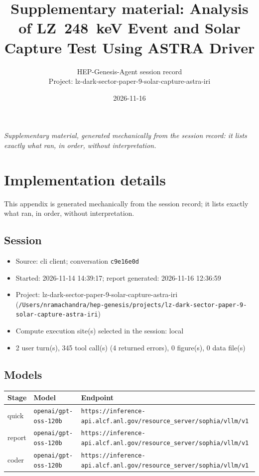\documentclass[11pt,a4paper]{article}
\title{Supplementary material: Analysis of LZ~248~keV Event and Solar Capture Test Using ASTRA Driver}
\author{HEP-Genesis-Agent session record \\ \small Project: lz-dark-sector-paper-9-solar-capture-astra-iri}
\date{2026-11-16}
\begin{document}
\maketitle
\noindent\textit{\small Supplementary material, generated mechanically from the session record: it lists exactly what ran, in order, without interpretation.}
\vspace{1em}



\appendix
\section{Implementation details}
\label{app:impl}
This appendix is generated mechanically from the session record; it lists exactly what ran, in order, without interpretation.
\subsection{Session}
\begin{itemize}
  \item Source: cli client; conversation \texttt{c9e16e0d}
  \item Started: 2026-11-14 14:39:17; report generated: 2026-11-16 12:36:59
  \item Project: lz-dark-sector-paper-9-solar-capture-astra-iri (\texttt{/\allowbreak{}Users/\allowbreak{}nramachandra/\allowbreak{}hep-genesis/\allowbreak{}projects/\allowbreak{}lz-dark-sector-paper-9-solar-capture-astra-iri})
  \item Compute execution site(s) selected in the session: local
  \item 2 user turn(s), 345 tool call(s) (4 returned errors), 0 figure(s), 0 data file(s)
\end{itemize}
\subsection{Models}
\begin{longtable}{@{}p{}p{}p{}@{}}
\toprule Stage & Model & Endpoint \\ \midrule \endhead
quick & \texttt{openai/\allowbreak{}gpt-oss-120b} & \texttt{https:\allowbreak{}/\allowbreak{}/\allowbreak{}inference-api.alcf.anl.gov/\allowbreak{}resource\_\allowbreak{}server/\allowbreak{}sophia/\allowbreak{}vllm/\allowbreak{}v1} \\
report & \texttt{openai/\allowbreak{}gpt-oss-120b} & \texttt{https:\allowbreak{}/\allowbreak{}/\allowbreak{}inference-api.alcf.anl.gov/\allowbreak{}resource\_\allowbreak{}server/\allowbreak{}sophia/\allowbreak{}vllm/\allowbreak{}v1} \\
coder & \texttt{openai/\allowbreak{}gpt-oss-120b} & \texttt{https:\allowbreak{}/\allowbreak{}/\allowbreak{}inference-api.alcf.anl.gov/\allowbreak{}resource\_\allowbreak{}server/\allowbreak{}sophia/\allowbreak{}vllm/\allowbreak{}v1} \\
\bottomrule\end{longtable}
\end{document}
